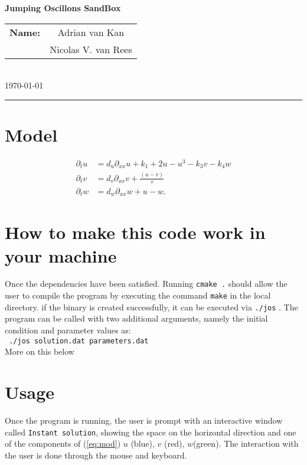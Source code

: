 \documentclass{article}
\begin{document}
\begin{center}
  {\Large \textbf{Jumping Oscillons SandBox}}
\end{center}
\begin{flushright}
  \begin{tabular}{cc}
    \textbf{Name:}&Adrian van Kan\\
    &Nicolas V. van Rees
  \end{tabular}\\
  \tiny{\today}
  \end{flushright}
  \hrule
\section{Model}
\begin{align}
  \label{eq:mod}
\partial_t u&=d_u\partial_{xx} u +k_1+2u-u^3-k_3v-k_4w\\
\partial_tv&=d_v\partial_{xx} v+\frac{(u-v)}{\tau} \nonumber\\
\partial_tw&=d_w\partial_{xx}w+u-w.\nonumber
\end{align}
\section{How to make this code work in your machine}
Once the dependencies have been satisfied. Running \verb!cmake .!
should allow the user to compile the program by executing the
command \verb!make! in the local directory. if the binary is created
successfully, it can be executed via \verb!./jos! . The program can be
called with two additional arguments, namely the initial condition and
parameter values as:\\
\verb! ./jos solution.dat parameters.dat!\\
More on this below
\section{Usage}
Once the program is running, the user is prompt with an interactive
window called \verb!Instant solution!, showing the space on the
horizontal direction and one of the components of (\ref{eq:mod}) $u$ (blue), $v$ (red),
$w$(green). The interaction with the user is done through the mouse
and keyboard. 
\end{document}

